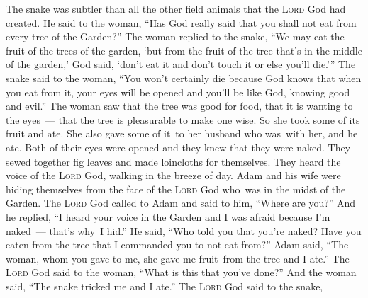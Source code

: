 
\begin{inparaenum}
     The snake was subtler than all the other field animals that the \textsc{Lord} God had created. He said to the woman, ``Has God really said that you shall not eat from every tree of the Garden?''%
     The woman replied to the snake, ``We may eat the fruit of the trees of the garden,%
     `but from the fruit of the tree that's in the middle of the garden,' God said, `don't eat it and don't touch it or else you'll die.'\thinspace''%
     The snake said to the woman, ``You won't certainly die%
     because God knows that when you eat from it, your eyes will be opened and you'll be like God, knowing good and evil.''%
     The woman saw that the tree was good for food, that it is wanting to the eyes~--- that the tree is pleasurable to make one wise. So she took some of its fruit and ate. She also gave some of it\understood\ to her husband who was\understood\ with her, and he ate.%
     Both of their eyes were opened and they knew that they were naked. They sewed together fig leaves and made loincloths for themselves.%
     They heard the voice of the \textsc{Lord} God, walking in the breeze of day. Adam and his wife were hiding themselves from the face of the \textsc{Lord} God who\understood\ was in the midst of the Garden.%
     The \textsc{Lord} God called to Adam and said to him, ``Where are you?''%
     And he replied, ``I heard your voice in the Garden and I was afraid because I'm naked~--- that's why\understood\ I hid.''%
     He said, ``Who told you that you're naked? Have you eaten from the tree that I commanded you to not eat from?''%
     Adam said, ``The woman, whom you gave to me, she gave me fruit\understood\ from the tree and I ate.''%
     The \textsc{Lord} God said to the woman, ``What is this that you've done?'' And the woman said, ``The snake tricked me and I ate.''%
     The \textsc{Lord} God said to the snake,\smallskip%
    

\end{inparaenum}
